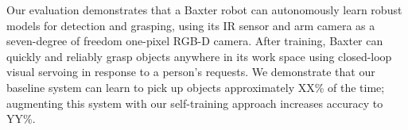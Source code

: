 \documentclass{article}
\begin{document}







Our evaluation demonstrates that a Baxter robot can autonomously learn
robust models for detection and grasping, using its IR sensor and arm
camera as a seven-degree of freedom one-pixel RGB-D camera.  After
training, Baxter can quickly and reliably grasp objects anywhere in
its work space using closed-loop visual servoing in response to a
person's requests.  We demonstrate that our baseline system can learn
to pick up objects approximately XX\% of the time; augmenting this
system with our self-training approach increases accuracy to YY\%.
\end{document}
